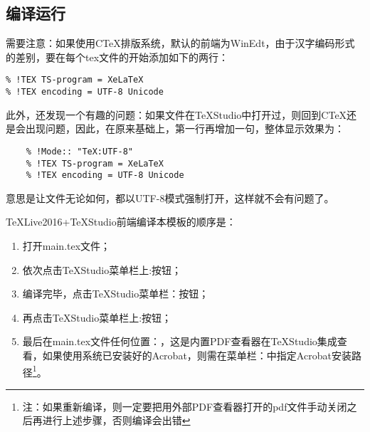 \subsection{编译运行}

需要注意：如果使用C\TeX 排版系统，默认的前端为WinEdt，由于汉字编码形式的差别，要在每个tex文件的开始添加如下的两行：
\begin{lstlisting}
% !TEX TS-program = XeLaTeX
% !TEX encoding = UTF-8 Unicode
\end{lstlisting}

此外，还发现一个有趣的问题：如果文件在\TeX{}Studio中打开过，则回到C\TeX{}还是会出现问题，因此，在原来基础上，第一行再增加一句，整体显示效果为：
\begin{lstlisting}
	% !Mode:: "TeX:UTF-8"
	% !TEX TS-program = XeLaTeX
	% !TEX encoding = UTF-8 Unicode
\end{lstlisting}
意思是让文件无论如何，都以UTF-8模式强制打开，这样就不会有问题了。


\TeX{}Live2016+\TeX{}Studio前端编译本模板的顺序是：
\begin{enumerate}
	\item 打开main.tex文件；
	\item 依次点击\TeX{}Studio菜单栏上:按钮；
	\item 编译完毕，点击\TeX{}Studio菜单栏：按钮；
	\item 再点击\TeX{}Studio菜单栏上:按钮；
	\item 最后在main.tex文件任何位置：，这是内置PDF查看器在\TeX{}Studio集成查看，如果使用系统已安装好的Acrobat，则需在菜单栏：中指定Acrobat安装路径\footnote{\kai 注：如果重新编译，则一定要把用外部PDF查看器打开的pdf文件手动关闭之后再进行上述步骤，否则编译会出错}。
\end{enumerate}

